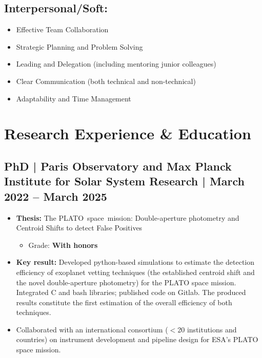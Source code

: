 \documentclass[11pt,a4paper]{article}
\begin{document}
\begin{multicols}{2}
		\subsection{Interpersonal/Soft:}
		
		\begin{itemize}
			\item Effective Team Collaboration
			\item Strategic Planning and Problem Solving
			\item Leading and Delegation (including mentoring junior colleagues)
			\item Clear Communication (both technical and non-technical)
			\item Adaptability and Time Management
		\end{itemize}
		
		
		\section{Research Experience \& Education}
		\subsection{ PhD | Paris Observatory and Max Planck Institute for Solar System Research | March 2022 – March 2025}
		\begin{itemize}
			\item \textbf{Thesis:} The \mbox{PLATO space mission:} Double-aperture photometry and Centroid Shifts to detect False Positives
			\begin{itemize}
				\item Grade: \textbf{With honors}
			\end{itemize}
			\item \textbf{Key result:} Developed python-based simulations to estimate the detection efficiency of exoplanet vetting techniques (the established centroid shift and the novel double-aperture photometry) for the PLATO space mission. Integrated C and bash libraries; published code on Gitlab. The produced results constitute the first estimation of the overall efficiency of both techniques.
			\item Collaborated with an international consortium ($<$20 institutions and countries) on instrument development and pipeline design for ESA's PLATO space mission.
		\end{itemize}
		

\end{multicols}
\end{document}
